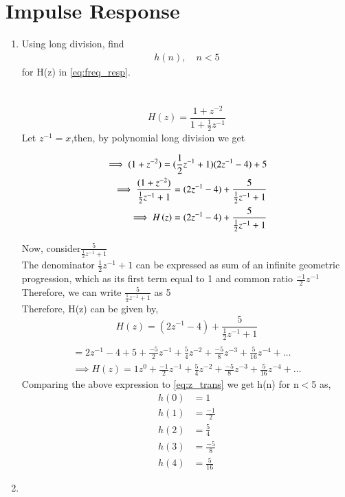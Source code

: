 \documentclass[journal,12pt,twocolumn]{IEEEtran}
\renewcommand\thesection{\arabic{section}}
\begin{document}
\section{Impulse Response}
\begin{enumerate}[label=\thesection.\arabic*]
	\item Using long division, 
find
		\begin{align}
			h(n), \quad n < 5
		\end{align}
		for H(z) in 
		\eqref{eq:freq_resp}.\\
		\\\solution\\
	\begin{equation}
		H(z) = \frac{1 + z^{-2}}{1 + \frac{1}{2} z^{-1}}
	\end{equation}
	Let $z^{-1} = x$,then, by polynomial long division we get
	
\begin{align}
	\implies (1+z^{-2})= (\frac{1}{2} z^{-1}+1)(2z^{-1}-4) + 5
	\\\implies \frac{(1+z^{-2})}{\frac{1}{2} z^{-1}+1}= (2z^{-1}-4) + \frac{5}{\frac{1}{2} z^{-1}+1}
	\\\implies H\left(z\right)=(2z^{-1}-4) + \frac{5}{\frac{1}{2} z^{-1}+1}
\end{align}

Now, consider$ \frac{5}{\frac{1}{2} z^{-1}+1}$
\\The denominator $\frac{1}{2} z^{-1}+1$ can be expressed as sum of an infinite geometric progression, which as its first term equal to 1 and common ratio $\frac{-1}{2}z^{-1}$
\\Therefore, we can write $ \frac{5}{\frac{1}{2} z^{-1}+1}$ as 5	
\\Therefore, H(z) can be given by,
\\\begin{equation}
	H(z)= (2z^{-1}-4) + \frac{5}{\frac{1}{2} z^{-1}+1}
\end{equation}
\begin{align}
	\\= 2z^{-1} - 4 + 5 + \frac{-5}{2}z^{-1} + \frac{5}{4}z^{-2} + \frac{-5}{8}z^{-3} + \frac{5}{16}z^{-4} + \dots
	\\\implies H(z)= 1z^{0} + \frac{-1}{2}z^{-1} +\frac{5}{4}z^{-2} + \frac{-5}{8}z^{-3} +\frac{5}{16}z^{-4} +\dots
\end{align}
Comparing the above expression to \eqref{eq:z_trans} we get h(n) for n$<$5 as, \\
\begin{align} 
	h(0) &= 1
	\\h(1) &= \frac{-1}{2}
	\\h(2) &= \frac{5}{4}
	\\h(3) &= \frac{-5}{8}
	\\h(4) &= \frac{5}{16}
\end{align}
\item \label{prob:impulse_resp}


\end{enumerate}
\end{document}
